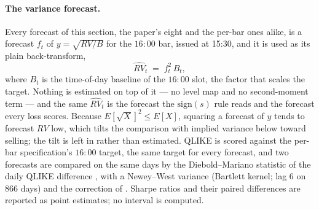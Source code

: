 \paragraph{The variance forecast.} Every forecast of this section, the
paper's eight and the per-bar ones alike, is a forecast $f_t$ of
$y=\sqrt{RV/B}$ for the $16{:}00$ bar, issued at 15:30, and it is used as its
plain back-transform,
\begin{equation}
    \widehat{RV}_t \;=\; f_t^{2}\,B_t,
    \label{eq:close_opt_plain}
\end{equation}
where $B_t$ is the time-of-day baseline of the $16{:}00$ slot, the factor that
scales the target. Nothing is estimated on top of it --- no level map and no
second-moment term --- and the same $\widehat{RV}_t$ is the forecast the
$\mathrm{sign}(s)$ rule reads and the forecast every loss scores. Because
$E[\sqrt{X}]^{2}\le E[X]$, squaring a forecast of $y$ tends to forecast $RV$
low, which tilts the comparison with implied variance below toward selling;
the tilt is left in rather than estimated. QLIKE is scored against the per-bar
specification's $16{:}00$ target, the same target for every forecast, and two
forecasts are compared on the same days by the Diebold--Mariano statistic of the
daily QLIKE difference \citep{DieboldMariano1995}, with a Newey--West variance
(Bartlett kernel; lag 6 on 866 days) and the correction of
\citet{HarveyLeybourneNewbold1997}. Sharpe ratios and their paired differences
are reported as point estimates; no interval is computed.


